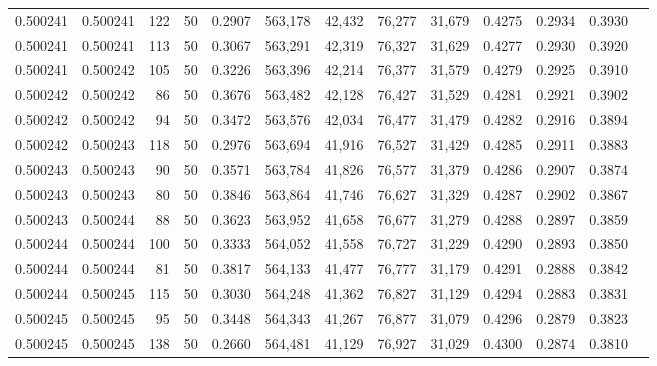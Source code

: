 \begin{tabular}{rrrrrrrrrrrrr}
0.500241 & 0.500241 &   122 &  50 &                                     0.2907 & 563,178 &  42,432 &  76,277 &  31,679 & 0.4275 & 0.2934 & 0.3930 \\
0.500241 & 0.500241 &   113 &  50 &                                     0.3067 & 563,291 &  42,319 &  76,327 &  31,629 & 0.4277 & 0.2930 & 0.3920 \\
0.500241 & 0.500242 &   105 &  50 &                                     0.3226 & 563,396 &  42,214 &  76,377 &  31,579 & 0.4279 & 0.2925 & 0.3910 \\
0.500242 & 0.500242 &    86 &  50 &                                     0.3676 & 563,482 &  42,128 &  76,427 &  31,529 & 0.4281 & 0.2921 & 0.3902 \\
0.500242 & 0.500242 &    94 &  50 &                                     0.3472 & 563,576 &  42,034 &  76,477 &  31,479 & 0.4282 & 0.2916 & 0.3894 \\
0.500242 & 0.500243 &   118 &  50 &                                     0.2976 & 563,694 &  41,916 &  76,527 &  31,429 & 0.4285 & 0.2911 & 0.3883 \\
0.500243 & 0.500243 &    90 &  50 &                                     0.3571 & 563,784 &  41,826 &  76,577 &  31,379 & 0.4286 & 0.2907 & 0.3874 \\
0.500243 & 0.500243 &    80 &  50 &                                     0.3846 & 563,864 &  41,746 &  76,627 &  31,329 & 0.4287 & 0.2902 & 0.3867 \\
0.500243 & 0.500244 &    88 &  50 &                                     0.3623 & 563,952 &  41,658 &  76,677 &  31,279 & 0.4288 & 0.2897 & 0.3859 \\
0.500244 & 0.500244 &   100 &  50 &                                     0.3333 & 564,052 &  41,558 &  76,727 &  31,229 & 0.4290 & 0.2893 & 0.3850 \\
0.500244 & 0.500244 &    81 &  50 &                                     0.3817 & 564,133 &  41,477 &  76,777 &  31,179 & 0.4291 & 0.2888 & 0.3842 \\
0.500244 & 0.500245 &   115 &  50 &                                     0.3030 & 564,248 &  41,362 &  76,827 &  31,129 & 0.4294 & 0.2883 & 0.3831 \\
0.500245 & 0.500245 &    95 &  50 &                                     0.3448 & 564,343 &  41,267 &  76,877 &  31,079 & 0.4296 & 0.2879 & 0.3823 \\
0.500245 & 0.500245 &   138 &  50 &                                     0.2660 & 564,481 &  41,129 &  76,927 &  31,029 & 0.4300 & 0.2874 & 0.3810 \\

\end{tabular}
